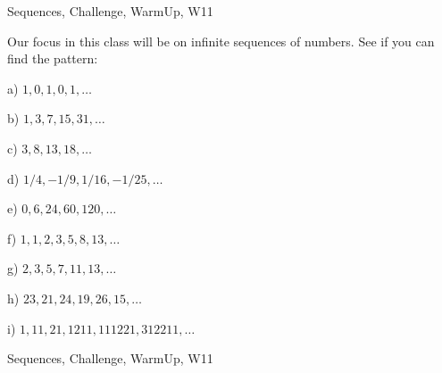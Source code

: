 \begin{tagblock}{Sequences, Challenge, WarmUp, W11}
\begin{question}

Our focus in this class will be on infinite sequences of numbers. See if you can find the pattern:

\bigskip

a) $1,0,1,0,1,\dots$

\bigskip

b) $1,3,7,15,31,\dots$

\bigskip

c) $3,8,13,18,\dots$ 

\bigskip 

d) $1/4,-1/9,1/16,-1/25,\dots$

\bigskip

e) $0,6,24,60,120,\dots$

\bigskip

f) $1,1,2,3,5,8,13,\dots$

\bigskip

g) $2,3,5,7,11,13,\dots$

\bigskip

h) $23,21,24,19,26,15,\dots$ 

\bigskip

i) $1,11,21,1211,111221,312211,\dots$
	
	
\begin{tags}
	    Sequences, Challenge, WarmUp, W11
\end{tags}
	
\begin{diary}
	   
\end{diary}
	
\begin{solution}	

\end{solution}
	
\end{question}

\end{tagblock}



